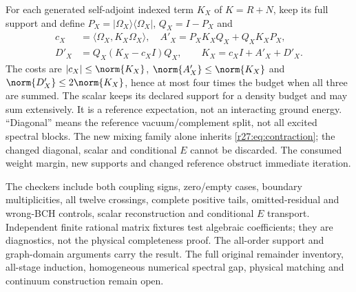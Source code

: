 For each generated self-adjoint indexed term $K_X$ of $K=R+N$, keep its full support and define $P_X=|\Omega_X\rangle\langle\Omega_X|$, $Q_X=I-P_X$ and
\begin{align}
c_X&=\langle\Omega_X,K_X\Omega_X\rangle,\quad
A'_X=P_XK_XQ_X+Q_XK_XP_X,\nonumber\\
D'_X&=Q_X(K_X-c_XI)Q_X,\qquad K_X=c_XI+A'_X+D'_X.
\label{r27:eq:split}
\end{align}
The costs are $|c_X|\le\norm{K_X}$, $\norm{A'_X}\le\norm{K_X}$ and
$\norm{D'_X}\le2\norm{K_X}$, hence at most four times the budget when all three are summed. The scalar keeps its declared support for a density budget and may sum extensively. It is a reference expectation, not an interacting ground energy. ``Diagonal'' means the reference vacuum/complement split, not all excited spectral blocks. The new mixing family alone inherits \eqref{r27:eq:contraction}; the changed diagonal, scalar and conditional $E$ cannot be discarded. The consumed weight margin, new supports and changed reference obstruct immediate iteration.

The checkers include both coupling signs, zero/empty cases, boundary multiplicities, all twelve crossings, complete positive tails, omitted-residual and wrong-BCH controls, scalar reconstruction and conditional $E$ transport. Independent finite rational matrix fixtures test algebraic coefficients; they are diagnostics, not the physical completeness proof. The all-order support and graph-domain arguments carry the result. The full original remainder inventory, all-stage induction, homogeneous numerical spectral gap, physical matching and continuum construction remain open.
